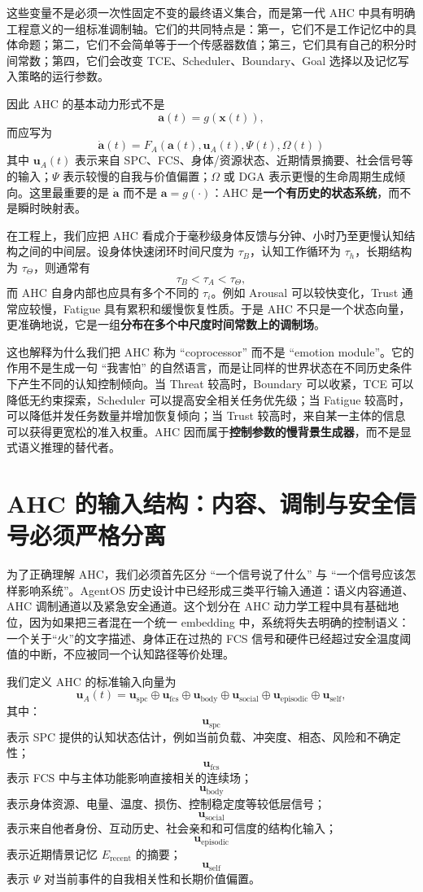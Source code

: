 这些变量不是必须一次性固定不变的最终语义集合，而是第一代 AHC 中具有明确工程意义的一组标准调制轴。它们的共同特点是：第一，它们不是工作记忆中的具体命题；第二，它们不会简单等于一个传感器数值；第三，它们具有自己的积分时间常数；第四，它们会改变 TCE、Scheduler、Boundary、Goal 选择以及记忆写入策略的运行参数。

因此 AHC 的基本动力形式不是
\[
\mathbf a(t)=g(\mathbf x(t)),
\]
而应写为
\[
\boxed{
\dot{\mathbf a}(t)
=
F_A\!\left(
\mathbf a(t),
\mathbf u_A(t),
\Psi(t),
\Omega(t)
\right)
}
\]
其中 $\mathbf u_A(t)$ 表示来自 SPC、FCS、身体/资源状态、近期情景摘要、社会信号等的输入；$\Psi$ 表示较慢的自我与价值偏置；$\Omega$ 或 DGA 表示更慢的生命周期生成倾向。这里最重要的是 $\dot{\mathbf a}$ 而不是 $\mathbf a=g(\cdot)$：AHC 是\textbf{一个有历史的状态系统}，而不是瞬时映射表。

在工程上，我们应把 AHC 看成介于毫秒级身体反馈与分钟、小时乃至更慢认知结构之间的中间层。设身体快速闭环时间尺度为 $\tau_B$，认知工作循环为 $\tau_h$，长期结构为 $\tau_\Theta$，则通常有
\[
\tau_B
<
\tau_A
<
\tau_\Theta ,
\]
而 AHC 自身内部也应具有多个不同的 $\tau_i$。例如 Arousal 可以较快变化，Trust 通常应较慢，Fatigue 具有累积和缓慢恢复性质。于是 AHC 不只是一个状态向量，更准确地说，它是一组\textbf{分布在多个中尺度时间常数上的调制场}。

这也解释为什么我们把 AHC 称为 ``coprocessor'' 而不是 ``emotion module''。它的作用不是生成一句 ``我害怕'' 的自然语言，而是让同样的世界状态在不同历史条件下产生不同的认知控制倾向。当 Threat 较高时，Boundary 可以收紧，TCE 可以降低无约束探索，Scheduler 可以提高安全相关任务优先级；当 Fatigue 较高时，可以降低并发任务数量并增加恢复倾向；当 Trust 较高时，来自某一主体的信息可以获得更宽松的准入权重。AHC 因而属于\textbf{控制参数的慢背景生成器}，而不是显式语义推理的替代者。


\section{AHC 的输入结构：内容、调制与安全信号必须严格分离}

为了正确理解 AHC，我们必须首先区分 ``一个信号说了什么'' 与 ``一个信号应该怎样影响系统''。AgentOS 历史设计中已经形成三类平行输入通道：语义内容通道、AHC 调制通道以及紧急安全通道。这个划分在 AHC 动力学工程中具有基础地位，因为如果把三者混在一个统一 embedding 中，系统将失去明确的控制语义：一个关于``火''的文字描述、身体正在过热的 FCS 信号和硬件已经超过安全温度阈值的中断，不应被同一个认知路径等价处理。

我们定义 AHC 的标准输入向量为
\[
\mathbf u_A(t)
=
\mathbf u_{\mathrm{spc}}
\oplus
\mathbf u_{\mathrm{fcs}}
\oplus
\mathbf u_{\mathrm{body}}
\oplus
\mathbf u_{\mathrm{social}}
\oplus
\mathbf u_{\mathrm{episodic}}
\oplus
\mathbf u_{\mathrm{self}},
\]
其中：
\[
\mathbf u_{\mathrm{spc}}
\]
表示 SPC 提供的认知状态估计，例如当前负载、冲突度、相态、风险和不确定性；
\[
\mathbf u_{\mathrm{fcs}}
\]
表示 FCS 中与主体功能影响直接相关的连续场；
\[
\mathbf u_{\mathrm{body}}
\]
表示身体资源、电量、温度、损伤、控制稳定度等较低层信号；
\[
\mathbf u_{\mathrm{social}}
\]
表示来自他者身份、互动历史、社会亲和和可信度的结构化输入；
\[
\mathbf u_{\mathrm{episodic}}
\]
表示近期情景记忆 $E_{\mathrm{recent}}$ 的摘要；
\[
\mathbf u_{\mathrm{self}}
\]
表示 $\Psi$ 对当前事件的自我相关性和长期价值偏置。

